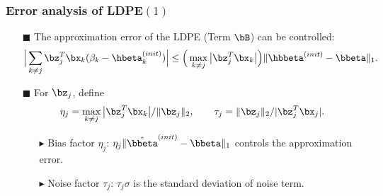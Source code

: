 \begin{frame}
\frametitle{Error analysis of LDPE$(1)$}
\begin{itemize}

\item[$\blacksquare$] The approximation error of the LDPE (Term $\bB$) can be controlled:
\begin{equation}
\Big|\sum_{k\neq j}\bz_j^T\bx_k(\beta_k-\hbeta_k^{(init)})\Big|
\le \Big(\max_{k\neq j}\big|\bz_j^T\bx_k\big|\Big)\|\hbbeta^{(init)}-\bbeta\|_1.
\end{equation}
\item[$\blacksquare$] For $\bz_{j}$, define
\begin{equation}
\label{defetatau}
\eta_j = \max_{k\neq j}\big|\bz_j^T\bx_k\big|/\|\bz_j\|_2,\qquad \tau_j = \|\bz_j\|_2/|\bz_j^T\bx_j|.
\end{equation}
   \begin{itemize}
   \item[$\blacktriangleright$] Bias factor $\eta_{j}$: $\eta_{j} \|\hat{\bbeta}^{(init)}-\bbeta\|_{1}$ controls the approximation error.
   \item[$\blacktriangleright$] Noise factor $\tau_{j}$: $\tau_{j} \sigma$ is the standard deviation of noise term.
   \end{itemize}

\end{itemize}


\end{frame}


